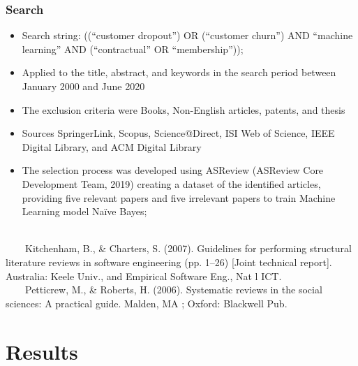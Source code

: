 \documentclass[10pt]{beamer}
\begin{document}
\begin{frame}
	\frametitle{Search }
	\begin{itemize}
		\item Search string: ((“customer dropout”) OR (“customer churn”) AND “machine learning” AND (“contractual” OR “membership”));
		\item Applied to the title, abstract, and keywords in the search period between January 2000 and June 2020
		\item The exclusion criteria were Books, Non-English articles, patents, and thesis
		\item Sources SpringerLink, Scopus, Science@Direct, ISI Web of Science, IEEE Digital Library, and ACM Digital Library
		\item The selection process was developed using ASReview (ASReview Core Development Team, 2019) creating a dataset of the identified articles, providing five relevant papers and five irrelevant papers to train Machine Learning model Naïve Bayes;
		\\~\\
	\end{itemize}
		\tiny 
~~~~Kitchenham, B., \& Charters, S. (2007). Guidelines for performing structural literature reviews in software engineering (pp. 1–26) [Joint technical report]. Australia: Keele Univ., and Empirical Software Eng., Nat l ICT.\\
~~~~Petticrew, M., \& Roberts, H. (2006). Systematic reviews in the social sciences: A practical guide. Malden, MA ; Oxford: Blackwell Pub.\\
\end{frame}


\section{Results}

\end{document}
